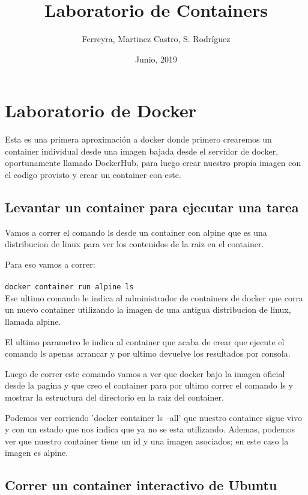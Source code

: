 \documentclass[11pt]{article} %
\title{Laboratorio de Containers}
\author{Ferreyra, Martinez Castro, S. Rodríguez}
\date{Junio, 2019} %
\begin{document}
\maketitle

\section{Laboratorio de Docker}
Esta es una primera aproximación a docker donde primero crearemos un container individual desde una imagen bajada desde el servidor de docker, oportunamente llamado DockerHub, para luego crear nuestro propia imagen con el codigo provisto y crear un container con este.

\subsection{Levantar un container para ejecutar una tarea}

Vamos a correr el comando ls desde un container con alpine que es una distribucion de linux para ver los contenidos de la raiz en el container.

Para eso vamos a correr:  \\ \\
	\texttt{docker container run alpine ls} 
	\\


Ese ultimo comando le indica al administrador de containers de docker que corra un nuevo container utilizando la imagen de una antigua distribucion de linux, llamada alpine.

El ultimo parametro le indica al container que acaba de crear que ejecute el comando ls apenas arrancar y por ultimo devuelve los resultados por consola.


Luego de correr este comando vamos a ver que docker bajo la imagen oficial desde la pagina y que creo el container para por ultimo correr el comando ls y mostrar la estructura del directorio en la raiz del container.

Podemos ver corriendo 'docker container ls --all' que nuestro container sigue vivo y con un estado que nos indica que ya no se esta utilizando. Ademas, podemos ver que nuestro  container tiene un id y una imagen asociados; en este caso la imagen es alpine.

\subsection{Correr un container interactivo de Ubuntu}
\end{document}
